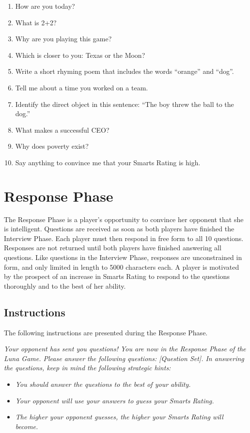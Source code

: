 \begin{enumerate}
\item How are you today?
\item What is 2+2?
\item Why are you playing this game?
\item Which is closer to you: Texas or the Moon?
\item Write a short rhyming poem that includes the words ``orange'' and ``dog''.
\item Tell me about a time you worked on a team.
\item Identify the direct object in this sentence: ``The boy threw the ball to the dog.''
\item What makes a successful CEO?
\item Why does poverty exist?
\item Say anything to convince me that your Smarts Rating is high.
\end{enumerate}

\section{Response Phase}

The Response Phase is a player's opportunity to convince her opponent that she is intelligent. Questions are received as soon as both players have finished the Interview Phase. Each player must then respond in free form to all 10 questions. Responses are not returned until both players have finished answering all questions. Like questions in the Interview Phase, responses are unconstrained in form, and only limited in length to 5000 characters each. A player is motivated by the prospect of an increase in Smarts Rating to respond to the questions thoroughly and to the best of her ability.

\subsection{Instructions}

The following instructions are presented during the Response Phase.
\begin{center}
\textit{Your opponent has sent you questions! You are now in the Response Phase of the Luna Game. Please answer the following questions: [Question Set]. In answering the questions, keep in mind the following strategic hints:}
\begin{itemize}
\item \textit{You should answer the questions to the best of your ability.}
\item \textit{Your opponent will use your answers to guess your Smarts Rating.}
\item \textit{The higher your opponent guesses, the higher your Smarts Rating will become.}
\end{itemize}
\end{center}

